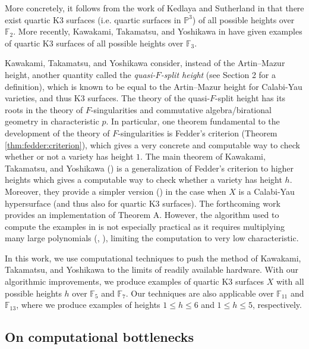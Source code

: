 More concretely, it follows from the work of
Kedlaya and Sutherland in 
\cite{kedlaya-sutherland-2016-census-k3-f2}
that there exist quartic K3 surfaces
(i.e. quartic surfaces in \(\mathbb{P}^{3}\))
of all possible heights over \(\mathbb{F}_{2}\).
More recently,
Kawakami, Takamatsu, and Yoshikawa in \cite{kty-2022-fedder}
have given examples of quartic K3 surfaces
of all possible heights over \(\mathbb{F}_{3}\).

Kawakami, Takamatsu, and Yoshikawa consider, 
instead of the Artin--Mazur height, another quantity called the
\textit{quasi-\(F\)-split height} 
(see Section 2 for a definition),
which is known to be equal to the Artin--Mazur height
for Calabi-Yau varieties, and thus K3 surfaces.
The theory of the quasi-\(F\)-split height has its
roots in the theory of \(F\)-singularities and commutative
algebra/birational geometry in characteristic \(p\).
In particular, one theorem fundamental
to the development of the theory of \(F\)-singularities
is Fedder's criterion (Theorem \ref{thm:fedder:criterion}), 
which gives a very concrete and computable way to check
whether or not a variety has height \(1\).
The main theorem of Kawakami, Takamatsu, and Yoshikawa
(\cite[Theorem~A]{kty-2022-fedder})
is a generalization of Fedder's criterion
to higher heights which gives a 
computable way to check whether a variety has height \(h\).
Moreover, they provide a simpler version
(\cite[Theorem~C]{kty-2022-fedder})
in the case when \(X\) is a Calabi-Yau hypersurface
(and thus also for quartic K3 surfaces).
The forthcoming work 
\cite{fgmqt-2025-witt-vectors-macaulay2} 
provides an implementation of Theorem A.
However, the algorithm used to compute the examples in
\cite{kty-2022-fedder}
is not especially practical
as it requires multiplying many large polynomials
(\cite{takamatsu-2024-algorithm}, 
\cite{fgmqt-2025-witt-vectors-macaulay2}),
limiting the computation to
very low characteristic.



In this work, we use computational techniques to push the method of Kawakami,
Takamatsu, and Yoshikawa to the limits of readily
available hardware.
With our algorithmic improvements, we produce examples of quartic K3 surfaces \(X\) with all
possible heights \(h\) 
over \(\mathbb{F}_{5}\) and \(\mathbb{F}_{7}\).
Our techniques are also applicable over \(\mathbb{F}_{11}\) and 
\(\mathbb{F}_{13}\), where
we produce examples of heights \(1 \leq h \leq 6\) and 
\(1 \leq h \leq 5\), respectively.

\subsection{On computational bottlenecks}

